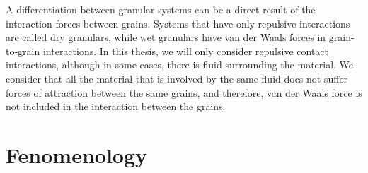     A differentiation between granular systems can be a direct result of the interaction forces between grains. Systems that have only repulsive interactions are called dry granulars, while wet granulars have van der Waals forces in grain-to-grain interactions. In this thesis, we will only consider repulsive contact interactions, although in some cases, there is fluid surrounding the material. We consider that all the material that is involved by the same fluid does not suffer forces of attraction between the same grains, and therefore, van der Waals force is not included in the interaction between the grains.

\section{Fenomenology}
\label{subchap:Fenomenologia}



